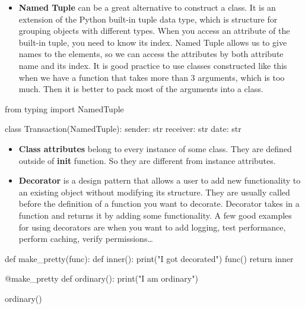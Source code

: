 \documentclass[
  letterpaper,
]{book}
\newenvironment{Shaded}{\begin{snugshade}}{\end{snugshade}}
\newcommand{\AttributeTok}[1]{\textcolor[rgb]{0.40,0.45,0.13}{#1}}
\newcommand{\BuiltInTok}[1]{\textcolor[rgb]{0.00,0.23,0.31}{#1}}
\newcommand{\ControlFlowTok}[1]{\textcolor[rgb]{0.00,0.23,0.31}{#1}}
\newcommand{\ImportTok}[1]{\textcolor[rgb]{0.00,0.46,0.62}{#1}}
\newcommand{\KeywordTok}[1]{\textcolor[rgb]{0.00,0.23,0.31}{#1}}
\newcommand{\NormalTok}[1]{\textcolor[rgb]{0.00,0.23,0.31}{#1}}
\newcommand{\StringTok}[1]{\textcolor[rgb]{0.13,0.47,0.30}{#1}}
\providecommand{\tightlist}{%
  \setlength{\itemsep}{0pt}\setlength{\parskip}{0pt}}\usepackage{longtable,booktabs,array}
\begin{document}
\begin{itemize}
\tightlist
\item
  \textbf{Named Tuple} can be a great alternative to construct a class.
  It is an extension of the Python built-in tuple data type, which is
  structure for grouping objects with different types. When you access
  an attribute of the built-in tuple, you need to know its index. Named
  Tuple allows us to give names to the elements, so we can access the
  attributes by both attribute name and its index. It is good practice
  to use classes constructed like this when we have a function that
  takes more than 3 arguments, which is too much. Then it is better to
  pack most of the arguments into a class.
\end{itemize}

\begin{Shaded}
\begin{Highlighting}[]
\ImportTok{from}\NormalTok{ typing }\ImportTok{import}\NormalTok{ NamedTuple}

\KeywordTok{class}\NormalTok{ Transaction(NamedTuple):}
\NormalTok{    sender: }\BuiltInTok{str}
\NormalTok{    receiver: }\BuiltInTok{str}
\NormalTok{    date: }\BuiltInTok{str}
\end{Highlighting}
\end{Shaded}

\begin{itemize}
\tightlist
\item
  \textbf{Class attributes} belong to every instance of some class. They
  are defined outside of \textbf{init} function. So they are different
  from instance attributes.
\item
  \textbf{Decorator} is a design pattern that allows a user to add new
  functionality to an existing object without modifying its structure.
  They are usually called before the definition of a function you want
  to decorate. Decorator takes in a function and returns it by adding
  some functionality. A few good examples for using decorators are when
  you want to add logging, test performance, perform caching, verify
  permissions\ldots{}
\end{itemize}

\begin{Shaded}
\begin{Highlighting}[]
\KeywordTok{def}\NormalTok{ make\_pretty(func):}
    \KeywordTok{def}\NormalTok{ inner():}
        \BuiltInTok{print}\NormalTok{(}\StringTok{"I got decorated"}\NormalTok{)}
\NormalTok{        func()}
\ControlFlowTok{return}\NormalTok{ inner}

\AttributeTok{@make\_pretty}
\KeywordTok{def}\NormalTok{ ordinary():}
    \BuiltInTok{print}\NormalTok{(}\StringTok{"I am ordinary"}\NormalTok{)}

\NormalTok{ordinary() }
\end{Highlighting}
\end{Shaded}
\end{document}
